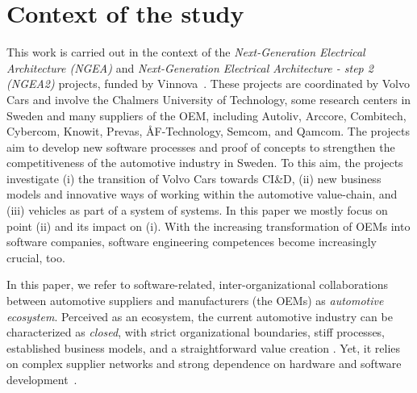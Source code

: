 \section{Context of the study}\label{sec:context}


This work is carried out in the context of 
{the {\em Next-Generation Electrical Architecture (NGEA)} and {\em Next-Generation Electrical Architecture - step 2 (NGEA2)} projects, funded by Vinnova~\cite{Vinnova}. 
These projects are coordinated by Volvo Cars and involve the Chalmers University of Technology, some research centers in Sweden and many suppliers of the OEM, including Autoliv, Arccore, Combitech, Cybercom, Knowit, Prevas, \AA F-Technology, Semcom, and Qamcom. The projects aim to develop new software processes and proof of concepts to strengthen the competitiveness of the automotive industry in Sweden.} 
To this aim, the projects investigate (i) the transition of %
Volvo Cars 
towards CI\&D, (ii) new business models and innovative ways of working within the automotive %
value-chain, %
and (iii) vehicles as part of a system of systems. 
In this paper we mostly focus on point (ii) %
and its impact on (i). %
With the increasing transformation of OEMs into software companies, software engineering competences become increasingly crucial, too.

{In this paper, we refer to software-related, }%
inter-organizational collaborations between automotive suppliers %
{and manufacturers (the OEMs) as \emph{automotive ecosystem}}. %
Perceived as an ecosystem, the current automotive industry can be characterized as \emph{closed}, with strict organizational boundaries, stiff processes, established business models, and a straightforward value creation \cite{ConnectedVehicle2012}.
Yet, it relies on complex supplier networks  and strong dependence on hardware and software development~\cite{Knauss2014d}. %


